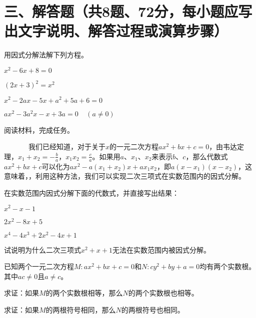 \documentclass[10pt]{article}
\begin{document}
\section*{\normalsize 三、解答题（共8题、72分，每小题应写出文字说明、解答过程或演算步骤）}
\begin{enumerate}\setcounter{enumi}{16}
    \item 用因式分解法解下列方程。
    \begin{compactenum}[（1）]
        \item $x^2-6x+8=0$
        \item $(2x+3)^2=x^2$
        \item $x^2-2ax-5x+a^2+5a+6=0$
        \item $ax^2-3a^2x-x+3a=0 \ \ \ \ \ (a \neq 0)$
    \end{compactenum}
    \addspace{}
    \item 阅读材料，完成任务。\par
    ~~~~~~~我们已经知道，对于关于$x$的一元二次方程$ax^2+bx+c=0$，由韦达定理，$x_1+x_2=-\frac{b}{a}$，$x_1x_2=\frac{c}{a}$。如果用$a$、$x_1$、$x_2$来表示$b$、$c$，那么代数式$ax^2+bx+c$可以化为$ax^2-a(x_1+x_2)x+ax_1x_2$，即$a(x-x_1)(x-x_2)$，这意味着，，利用这种方法，我们可以实现二次三项式在实数范围内的因式分解。
    \begin{compactenum}[（1）]
        \item 在实数范围内因式分解下面的代数式，并直接写出结果：
        \begin{compactenum}
            \item[\circnum{1}] $x^2-x-1$
            \item[\circnum{2}] $2x^2-8x+5$
            \item[\circnum{3}] $x^4-4x^3+2x^2-4x+1$
        \end{compactenum}
        \item 试说明为什么二次三项式$x^2+x+1$无法在实数范围内被因式分解。
    \end{compactenum}
    \newpage
    \item 已知两个一元二次方程$M:ax^{2} + bx + c = 0$和$N:cy^{2} + by + a = 0$均有两个实数根。其中$ac \neq 0$且$a \neq c$。
    \begin{compactenum}[（1）]
        \item 求证：如果$M$的两个实数根相等，那么$N$的两个实数根也相等。
        \item 求证：如果$M$的两根符号相同，那么$N$的两根符号也相同。

\end{compactenum}
\end{enumerate}
\end{document}

